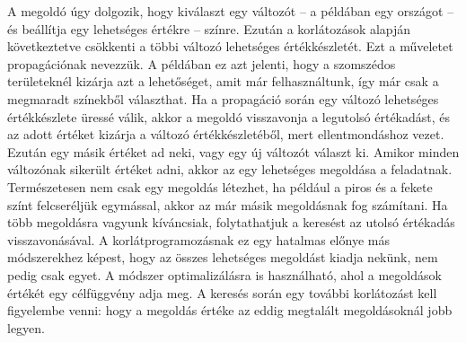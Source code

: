 \documentclass[12pt,a4paper,twoside, openright]{report}
\begin{document}
		
		A megoldó úgy dolgozik, hogy kiválaszt egy változót – a példában egy országot – és beállítja egy lehetséges értékre – színre. Ezután a korlátozások alapján következtetve csökkenti a többi változó lehetséges értékkészletét. Ezt a műveletet propagációnak nevezzük. A példában ez azt jelenti, hogy a szomszédos területeknél kizárja azt a lehetőséget, amit már felhasználtunk, így már csak a megmaradt színekből választhat.
		Ha a propagáció során egy változó lehetséges értékkészlete üressé válik, akkor a megoldó visszavonja a legutolsó értékadást, és az adott értéket kizárja a változó értékkészletéből, mert ellentmondáshoz vezet. Ezután egy másik értéket ad neki, vagy egy új változót választ ki.
		Amikor minden változónak sikerült értéket adni, akkor az egy lehetséges megoldása a feladatnak. Természetesen nem csak egy megoldás létezhet, ha például a piros és a fekete színt felcseréljük egymással, akkor az már másik megoldásnak fog számítani. Ha több megoldásra vagyunk kíváncsiak, folytathatjuk a keresést az utolsó értékadás visszavonásával. A korlátprogramozásnak ez egy hatalmas előnye más módszerekhez képest, hogy az összes lehetséges megoldást kiadja nekünk, nem pedig csak egyet.
		A módszer optimalizálásra is használható, ahol a megoldások értékét egy célfüggvény adja meg. A keresés során egy további korlátozást kell figyelembe venni: hogy a megoldás értéke az eddig megtalált megoldásoknál jobb legyen.
		
    
\end{document}
